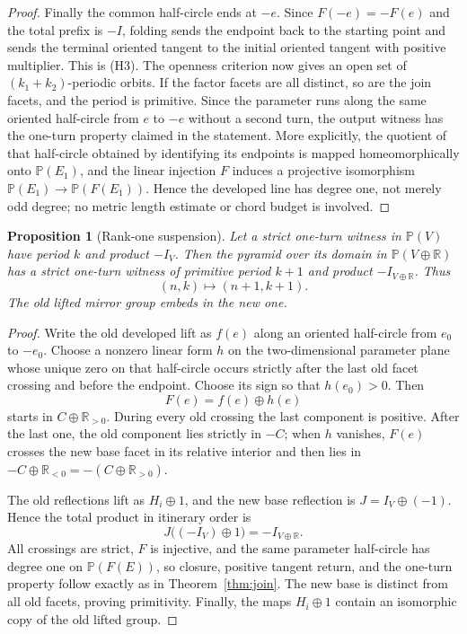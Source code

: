 \documentclass[11pt,a4paper]{article}
\theoremstyle{plain}
\newtheorem{proposition}[theorem]{Proposition}
\theoremstyle{definition}
\theoremstyle{remark}
\begin{document}
\begin{proof}
Finally the common half-circle ends at $-e$.  Since $F(-e)=-F(e)$ and the total
prefix is $-I$, folding sends the endpoint back to the starting point and sends the
terminal oriented tangent to the initial oriented tangent with positive multiplier.
This is \textup{(H3)}.  The openness criterion now gives an open set of
$(k_1+k_2)$-periodic orbits.  If the factor facets are all distinct, so are the join
facets, and the period is primitive.  Since the parameter runs along the same
oriented half-circle from $e$ to $-e$ without a second turn, the output witness has
the one-turn property claimed in the statement.  More explicitly, the quotient
of that half-circle obtained by identifying its endpoints is mapped
homeomorphically onto $\mathbb P(E_1)$, and the linear injection $F$ induces a
projective isomorphism $\mathbb P(E_1)\to\mathbb P(F(E_1))$.  Hence the developed
line has degree one, not merely odd degree; no metric length estimate or chord
budget is involved.
\end{proof}

\begin{proposition}[Rank-one suspension]
\label{prop:rank-one-suspension}
Let a strict one-turn witness in $\mathbb P(V)$ have period $k$ and product
$-I_V$.  Then the pyramid over its domain in $\mathbb P(V\oplus\mathbb R)$ has a
strict one-turn witness of primitive period $k+1$ and product
$-I_{V\oplus\mathbb R}$.  Thus
\[
                         (n,k)\longmapsto(n+1,k+1).
\]
The old lifted mirror group embeds in the new one.
\end{proposition}

\begin{proof}
Write the old developed lift as $f(e)$ along an oriented half-circle from $e_0$
to $-e_0$.  Choose a nonzero linear form $h$ on the two-dimensional parameter
plane whose unique zero on that half-circle occurs strictly after the last old
facet crossing and before the endpoint.  Choose its sign so that $h(e_0)>0$.
Then
\[
                         F(e)=f(e)\oplus h(e)
\]
starts in $C\oplus\mathbb R_{>0}$.  During every old crossing the last component
is positive.  After the last one, the old component lies strictly in $-C$; when
$h$ vanishes, $F(e)$ crosses the new base facet in its relative interior and
then lies in $-C\oplus\mathbb R_{<0}=-(C\oplus\mathbb R_{>0})$.

The old reflections lift as $H_i\oplus1$, and the new base reflection is
$J=I_V\oplus(-1)$.  Hence the total product in itinerary order is
\[
        J\bigl((-I_V)\oplus1\bigr)=-I_{V\oplus\mathbb R}.
\]
All crossings are strict, $F$ is injective, and the same parameter half-circle
has degree one on $\mathbb P(F(E))$, so closure, positive tangent return, and the
one-turn property follow exactly as in Theorem~\ref{thm:join}.  The new base is
distinct from all old facets, proving primitivity.  Finally, the maps
$H_i\oplus1$ contain an isomorphic copy of the old lifted group.
\end{proof}
\end{document}
